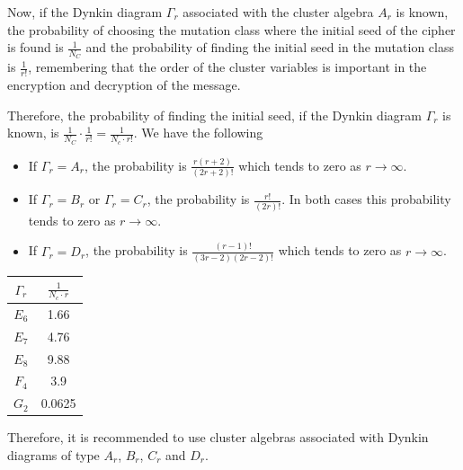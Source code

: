 \documentclass[12pt,a4paper]{article}
\begin{document}
Now, if the Dynkin diagram $\Gamma_r$ associated with the cluster algebra $A_r$ is known, the probability of choosing the mutation class where the initial seed of the cipher is found is $\frac{1}{N_C}$ and the probability of finding the initial seed in the mutation class is $\frac{1}{r!}$, remembering that the order of the cluster variables is important in the encryption and decryption of the message.


Therefore, the probability of finding the initial seed, if the Dynkin diagram $\Gamma_r$ is known, is $\frac{1}{N_C}\cdot \frac{1}{r!}=\frac{1}{N_c\cdot r!}$. We have the following
\begin{itemize}
\item If $\Gamma_r=A_r$, the probability is   $\frac{r(r+2)}{(2r+2)!}$ which tends to zero  as $r\rightarrow \infty$.
\item If $\Gamma_r=B_r$ or $\Gamma_r=C_r$, the probability is   $\frac{r!}{(2r)!}$. In both cases this probability tends to zero  as $r\rightarrow \infty$.
\item If  $\Gamma_r=D_r$, the probability is   $\frac{(r-1)!}{(3r-2)(2r-2)!}$ which tends to zero  as $r\rightarrow \infty$.

\end{itemize}

\begin{table}[h]
\centering
\begin{tabular}{|c|c|}
\hline
$\Gamma_r$ & $\frac{1}{N_c \cdot r}$ \\ \hline
$E_6$      & 1.66                     \\ \hline
$E_7$      & 4.76                     \\ \hline
$E_8$      & 9.88                     \\ \hline
$F_4$      & 3.9                      \\ \hline
$G_2$      & 0.0625                   \\ \hline
\end{tabular}
\end{table}


Therefore, it is recommended to use cluster algebras associated with Dynkin diagrams of type $A_r$, $B_r$, $C_r$ and $D_r$.
\end{document}
